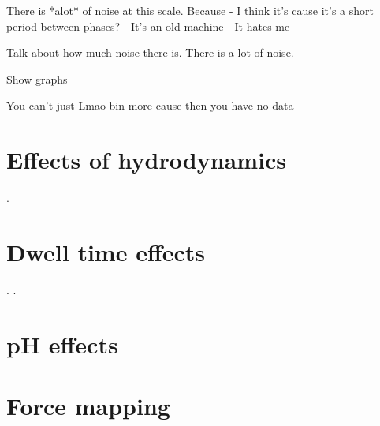 There is *alot* of noise at this scale. Because 
- I think it's cause it's a short period between phases?
- It's an old machine
- It hates me

Talk about how much noise there is. There is a lot of noise.

Show graphs

You can't just Lmao bin more cause then you have no data



\section{Effects of hydrodynamics}

\newpage.
\newpage

\section{Dwell time effects}

\newpage.
\newpage.
\newpage

\section{pH effects}

\newpage
\newpage

\section{Force mapping}


